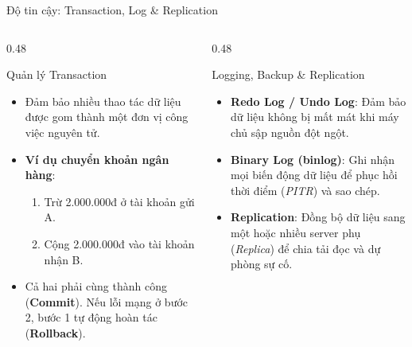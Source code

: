 \documentclass[aspectratio=169,11pt]{beamer}
\newcommand{\kw}[1]{\textcolor{dbblue}{\textbf{#1}}}
\begin{document}
\begin{frame}{Độ tin cậy: Transaction, Log \& Replication}
\begin{columns}[t]
  \begin{column}{0.48\textwidth}
    \begin{block}{Quản lý Transaction}
      \begin{itemize}\footnotesize
        \item Đảm bảo nhiều thao tác dữ liệu được gom thành một đơn vị công việc nguyên tử.
        \item \textbf{Ví dụ chuyển khoản ngân hàng}:
          \begin{enumerate}\scriptsize
            \item Trừ 2.000.000đ ở tài khoản gửi A.
            \item Cộng 2.000.000đ vào tài khoản nhận B.
          \end{enumerate}
        \item Cả hai phải cùng thành công (\kw{Commit}). Nếu lỗi mạng ở bước 2, bước 1 tự động hoàn tác (\kw{Rollback}).
      \end{itemize}
    \end{block}
  \end{column}
  \begin{column}{0.48\textwidth}
    \begin{block}{Logging, Backup \& Replication}
      \begin{itemize}\footnotesize
        \item \kw{Redo Log / Undo Log}: Đảm bảo dữ liệu không bị mất mát khi máy chủ sập nguồn đột ngột.
        \item \kw{Binary Log (binlog)}: Ghi nhận mọi biến động dữ liệu để phục hồi thời điểm (\textit{PITR}) và sao chép.
        \item \kw{Replication}: Đồng bộ dữ liệu sang một hoặc nhiều server phụ (\textit{Replica}) để chia tải đọc và dự phòng sự cố.
      \end{itemize}
    \end{block}
  \end{column}
\end{columns}
\end{frame}

\end{document}
